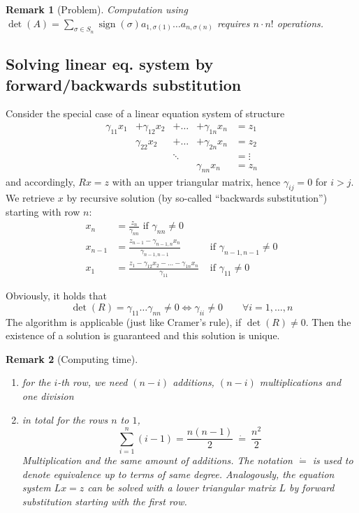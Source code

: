 \documentclass[a4paper]{article}
\numberwithin{lecref}{section}
\theoremstyle{break}
\newtheorem*{Remark}{Remark}
\newcommand{\dotted}[1]{\:\dot{#1}\:}  %
\DeclareMathOperator{\sign}{sign}
\begin{document}
\begin{Remark}[Problem]
  Computation using $\det(A) = \sum_{\sigma \in S_n} \sign(\sigma) a_{1,\sigma(1)} \dots a_{n,\sigma(n)}$ requires $n \cdot n!$ operations.
\end{Remark}

\subsection{Solving linear eq. system by forward/backwards substitution}
%
Consider the special case of a linear equation system of structure
\[
  \begin{array}{rrrrl}
    \gamma_{11} x_1 &+ \gamma_{12} x_2 &+ \dots &+ \gamma_{1n} x_n &= z_1 \\
                    &  \gamma_{22} x_2 &+ \dots &+ \gamma_{2n} x_n &= z_2 \\
                    &                  & \ddots &                  &= \vdots \\
                    &                  &        &  \gamma_{nn} x_n &= z_n
  \end{array}
\]%
%
and accordingly, $Rx = z$ with an upper triangular matrix, hence $\gamma_{ij} = 0$ for $i > j$.
We retrieve $x$ by recursive solution (by so-called \enquote{backwards substitution}) starting with row $n$:
\begin{align*}
  x_n &= \frac{z_n}{\gamma_{nn}} \text{ if } \gamma_{nn} \neq 0 \\
  x_{n-1} &= \frac{z_{n-1} - \gamma_{n-1,n} x_n}{\gamma_{n-1,n-1}} &\text{ if } \gamma_{n-1,n-1} \neq 0 \\
  x_{1} &= \frac{z_1 - \gamma_{12} x_2 - \dots - \gamma_{1n} x_n}{\gamma_{11}} &\text{ if } \gamma_{11} \neq 0
\end{align*}

Obviously, it holds that
\[ \det(R) = \gamma_{11} \dots \gamma_{nn} \neq 0 \iff \gamma_{ii} \neq 0 \qquad \forall i = 1, \dots, n \]
The algorithm is applicable (just like Cramer's rule), if $\det(R) \neq 0$.
Then the existence of a solution is guaranteed and this solution is unique.

\begin{Remark}[Computing time]\hfill{}
  \begin{enumerate}
    \item for the $i$-th row, we need $(n-i)$ additions, $(n-i)$ multiplications and one division
    \item in total for the rows $n$ to $1$,
      \[ \sum_{i=1}^n (i - 1) = \frac{n (n - 1)}2 \dotted{=} \frac{n^2}2 \]
      Multiplication and the same amount of additions.
      The notation $\dot=$ is used to denote equivalence up to terms of same degree.
      Analogously, the equation system $Lx = z$ can be solved with a lower triangular matrix $L$ by forward substitution starting with the first row.
  \end{enumerate}
\end{Remark}
\end{document}
